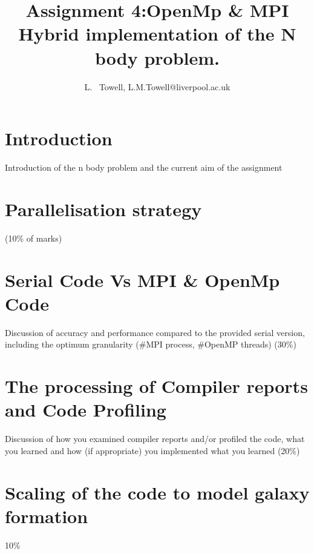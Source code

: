 \documentclass[a4paper, twoside, 11pt]{article}
\author{L. ~Towell, L.M.Towell@liverpool.ac.uk}
\title{Assignment 4:\break OpenMp \& MPI Hybrid implementation of the N body problem.}
\begin{document}
	\maketitle

\maketitle

\section{Introduction}
Introduction of the n body problem and the current aim of the assignment
\section{Parallelisation strategy }(10\% of marks)
\section{Serial Code Vs MPI \& OpenMp Code}
Discussion of accuracy and performance compared to the provided serial version,
including the optimum granularity (\#MPI process, \#OpenMP threads) (30\%)
\section{The processing of Compiler reports and Code Profiling}
Discussion of how you examined compiler reports and/or profiled the code, what
you learned and how (if appropriate) you implemented what you learned (20\%)
\section{Scaling of the code to model galaxy formation} 10\% \\
\end{document}
